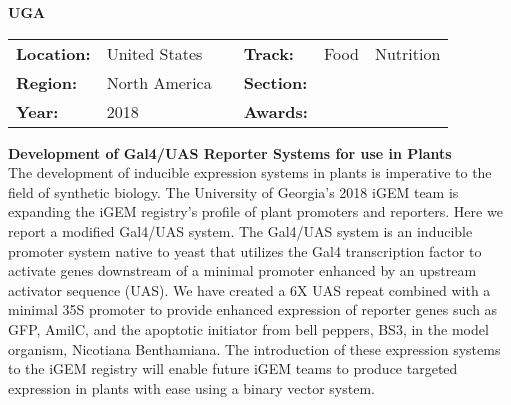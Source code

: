 \textbf{\uppercase{UGA}}
\FloatBarrier
\begin{table}[h]
\begin{tabular}{lp{2.5cm}llll}
\textbf{Location:} & United States & \multicolumn{1}{|l}{} & \textbf{Track:}   & Food & Nutrition \\
\textbf{Region:}   & North America   & \multicolumn{1}{|l}{} & \textbf{Section:} &  \\
\textbf{Year:}     & 2018   & \multicolumn{1}{|l}{} & \textbf{Awards:}  &
\end{tabular}
\end{table}
\FloatBarrier
\noindent	\textbf{Development of Gal4/UAS Reporter Systems for use in Plants} \vspace{.2cm}\\
The development of inducible expression systems in plants is imperative to the field of synthetic biology. The University of Georgia’s 2018 iGEM team is expanding the iGEM registry’s profile of plant promoters and reporters. Here we report a modified Gal4/UAS system. The Gal4/UAS system is an inducible promoter system native to yeast that utilizes the Gal4 transcription factor to activate genes downstream of a minimal promoter enhanced by an upstream activator sequence (UAS). We have created a 6X UAS repeat combined with a minimal 35S promoter to provide enhanced expression of reporter genes such as GFP, AmilC, and the apoptotic initiator from bell peppers, BS3, in the model organism, Nicotiana Benthamiana. The introduction of these expression systems to the iGEM registry will enable future iGEM teams to produce targeted expression in plants with ease using a binary vector system.
\vspace{2cm}

